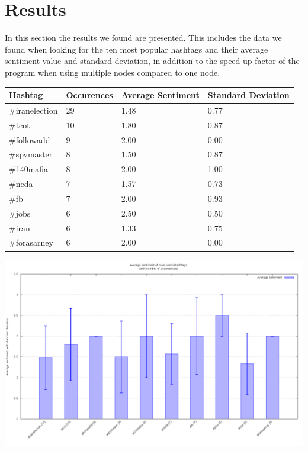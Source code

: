 \documentclass[a4paper,12px]{article}
\begin{document}
\section{Results}

In this section the results we found are presented. This includes the data we
found when looking for the ten most popular hashtags and their average sentiment
value and standard deviation, in addition to the speed up factor of the program
when using multiple nodes compared to one node. \\

\noindent\begin{tabularx}{\textwidth}{p{} p{} p{} p{}}
    Hashtag & Occurences & Average Sentiment & Standard Deviation \\
    \hline
    \#iranelection  & 29 & 1.48 & 0.77 \\
    \#tcot          & 10 & 1.80 & 0.87 \\
    \#followadd     & 9  & 2.00 & 0.00 \\
    \#spymaster     & 8  & 1.50 & 0.87 \\
    \#140mafia      & 8  & 2.00 & 1.00 \\
    \#neda          & 7  & 1.57 & 0.73 \\
    \#fb            & 7  & 2.00 & 0.93 \\
    \#jobs          & 6  & 2.50 & 0.50 \\
    \#iran          & 6  & 1.33 & 0.75 \\
    \#forasarney    & 6  & 2.00 & 0.00 \\
\end{tabularx}

\begin{center}
    \includegraphics[width=\textwidth]{sentiment}
\end{center}
\end{document}
